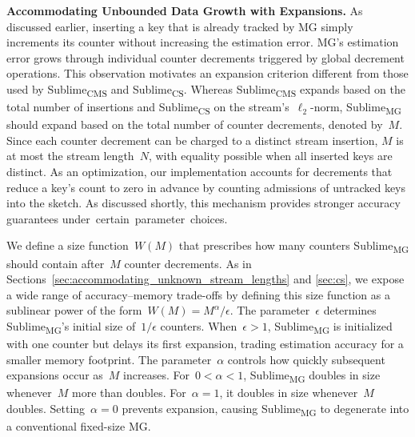 \documentclass[sigconf]{acmart}
\newcommand{\sketch}{Sublime}
\newcommand{\sketchcms}{\sketch\textsubscript{CMS}\xspace}
\newcommand{\sketchcs}{\sketch\textsubscript{CS}\xspace}
\newcommand{\sketchmg}{\sketch\textsubscript{MG}\xspace}
\begin{document}
\textbf{Accommodating Unbounded Data Growth with Expansions.}
As discussed earlier, inserting a key that is already tracked by MG simply increments its counter without increasing the estimation error.
MG's estimation error grows through individual counter decrements triggered by global decrement operations.
This observation motivates an expansion criterion different from those used by \sketchcms and \sketchcs.
Whereas \sketchcms expands based on the total number of insertions and \sketchcs on the stream's~$\ell_2$-norm, \sketchmg should expand based on the total number of counter decrements, denoted by~$M$.
Since each counter decrement can be charged to a distinct stream insertion, $M$ is at most the stream length~$N$, with equality possible when all inserted keys are distinct.
As an optimization, our implementation accounts for decrements that reduce a key's count to zero in advance by counting admissions of untracked keys into the sketch.
As discussed shortly, this mechanism provides stronger accuracy guarantees \mbox{under certain parameter choices}.

We define a size function~$W(M)$ that prescribes how many counters \sketchmg should contain after~$M$ counter decrements.
As in Sections~\ref{sec:accommodating_unknown_stream_lengths} and \ref{sec:cs}, we expose a wide range of accuracy--memory trade-offs by defining this size function as a sublinear power of the form~$W(M)=M^\alpha/\epsilon$.
The parameter~$\epsilon$ determines \sketchmg's initial size of~$1/\epsilon$ counters.
When~$\epsilon>1$, \sketchmg is initialized with one counter but delays its first expansion, trading estimation accuracy for a smaller memory footprint.
The parameter~$\alpha$ controls how quickly subsequent expansions occur as~$M$ increases.
For~$0<\alpha<1$, \sketchmg doubles in size whenever~$M$ more than doubles.
For~$\alpha=1$, it doubles in size whenever~$M$ doubles.
Setting~$\alpha=0$ prevents expansion, causing \sketchmg to degenerate into a conventional fixed-size MG.
\end{document}
